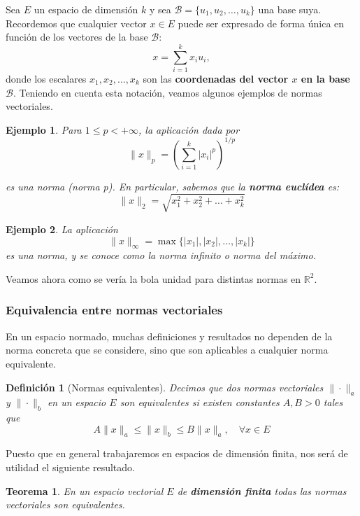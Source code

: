 \documentclass[11pt, a4paper]{article}
\newif\IfInSansMode
\numberwithin{equation}{section}
\theoremstyle{theorem-style}
\newtheorem{nth}{Teorema}[section]
\theoremstyle{definition-style}
\newtheorem{ndef}{Definición}[section]
\theoremstyle{remark-style}
\theoremstyle{example-style}
\newtheorem{ejemplo}{Ejemplo}[section]
\begin{document}
Sea $E$ un espacio de dimensión $k$ y sea $\mathcal B = \{u_1,u_2,\dots,u_k\}$ una base suya. Recordemos que cualquier vector $x \in E$ puede ser expresado de forma única en función de los vectores de la base $\mathcal B$: $$x = \sum_{i=1}^k x_i u_i,$$ donde los escalares $x_1,x_2,\dots,x_k$ son las \textbf{coordenadas del vector $x$ en la base $\mathcal B$}. Teniendo en cuenta esta notación, veamos algunos ejemplos de normas vectoriales.

\begin{ejemplo} Para $1 \le p < + \infty$, la aplicación dada por $$\|x\|_p = \left( \sum_{i=1}^k |x_i|^p \right)^{1/p}$$ 

es una norma (\textit{norma p}). En particular, sabemos que la \textbf{norma euclídea} es: $$\|x\|_2 = \sqrt{x_1^2 + x_2^2 + \dots + x_k^2}$$
	
\end{ejemplo}

\begin{ejemplo}
	La aplicación $$\|x\|_\infty = \max\{|x_1|,|x_2|,\dots ,|x_k|\}$$ es una norma, y se conoce como la \textit{norma infinito} o \textit{norma del máximo}.
\end{ejemplo}


Veamos ahora como se vería la bola unidad para distintas normas en $\mathbb{R}^2$.


\subsubsection{Equivalencia entre normas vectoriales}

En un espacio normado, muchas definiciones y resultados no dependen de la norma concreta que se considere, sino que son aplicables a cualquier norma equivalente.

\begin{ndef}[Normas equivalentes] Decimos que dos normas vectoriales $\|\cdot\|_a$ y $\|\cdot\|_b$ en un espacio $E$ son equivalentes si existen constantes $A,B > 0$ tales que $$A\|x\|_a \le \|x\|_b \le B\|x\|_a,\quad \forall x \in E$$
	
\end{ndef}

Puesto que en general trabajaremos en espacios de dimensión finita, nos será de utilidad el siguiente resultado.

\begin{nth}
	En un espacio vectorial $E$ de \textbf{dimensión finita} todas las normas
vectoriales son equivalentes.
\end{nth}
\end{document}
